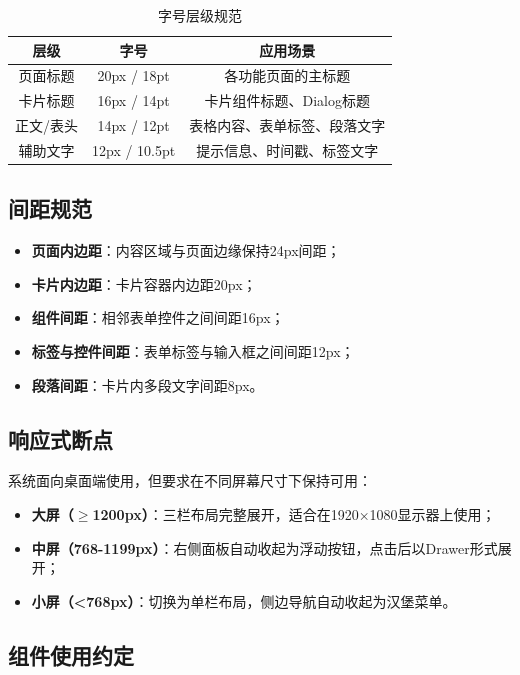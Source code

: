 \documentclass{../../softeng}
\begin{document}
\begin{table}[htbp]
\centering
\caption{字号层级规范}
\label{tab:font_size}
\begin{tabular}{|c|c|c|}
\hline
\textbf{层级} & \textbf{字号} & \textbf{应用场景} \\
\hline
页面标题 & 20px / 18pt & 各功能页面的主标题 \\
\hline
卡片标题 & 16px / 14pt & 卡片组件标题、Dialog标题 \\
\hline
正文/表头 & 14px / 12pt & 表格内容、表单标签、段落文字 \\
\hline
辅助文字 & 12px / 10.5pt & 提示信息、时间戳、标签文字 \\
\hline
\end{tabular}
\end{table}

\subsection{间距规范}

\begin{itemize}
    \item \textbf{页面内边距}：内容区域与页面边缘保持24px间距；
    \item \textbf{卡片内边距}：卡片容器内边距20px；
    \item \textbf{组件间距}：相邻表单控件之间间距16px；
    \item \textbf{标签与控件间距}：表单标签与输入框之间间距12px；
    \item \textbf{段落间距}：卡片内多段文字间距8px。
\end{itemize}

\subsection{响应式断点}

系统面向桌面端使用，但要求在不同屏幕尺寸下保持可用：

\begin{itemize}
    \item \textbf{大屏（$\ge$1200px）}：三栏布局完整展开，适合在1920×1080显示器上使用；
    \item \textbf{中屏（768-1199px）}：右侧面板自动收起为浮动按钮，点击后以Drawer形式展开；
    \item \textbf{小屏（<768px）}：切换为单栏布局，侧边导航自动收起为汉堡菜单。
\end{itemize}

\subsection{组件使用约定}
\end{document}
